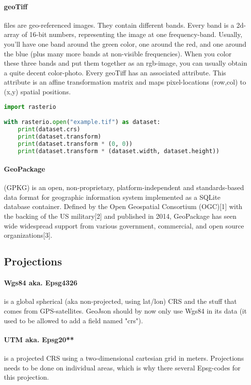 \paragraph{geoTiff} files are geo-referenced images. They contain different bands.
Every band is a 2d-array of 16-bit numbers, representing the image at one frequency-band.
Usually, you'll have one band around the green color, one around the red, and one around the blue (plus many more bands at non-visible frequencies).
When you color these three bands and put them together as an rgb-image, you can usually obtain a quite decent color-photo. 
Every geoTiff has an associated  attribute. This attribute is an affine transformation matrix and maps pixel-locations (row,col) to (x,y) spatial positions.
\begin{lstlisting}[language=python]
import rasterio

with rasterio.open("example.tif") as dataset:
    print(dataset.crs)
    print(dataset.transform)
    print(dataset.transform * (0, 0))
    print(dataset.transform * (dataset.width, dataset.height))
\end{lstlisting}

\paragraph{GeoPackage} (GPKG) is an open, non-proprietary, platform-independent and standards-based data format for geographic information system implemented as a SQLite database container.
Defined by the Open Geospatial Consortium (OGC)[1] with the backing of the US military[2] and published in 2014, GeoPackage has seen wide widespread support from various government,
commercial, and open source organizations[3].








\subsection{Projections}

\paragraph{Wgs84 aka. Epsg4326} is a global spherical (aka non-projected, using lat/lon) CRS and the stuff that comes from GPS-satellites. GeoJson should by now only  use Wgs84 in its data (it used to be allowed to add a field named "crs"). 
\paragraph{UTM aka. Epsg20**} is a projected CRS using a  two-dimensional cartesian grid in meters. Projections needs to be done on individual areas, which is why there several Epsg-codes for this projection.
